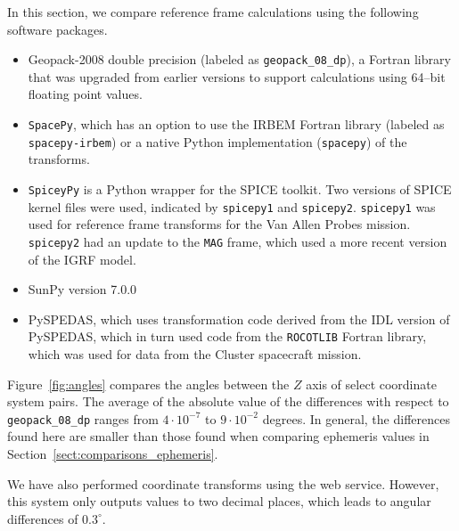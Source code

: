 \documentclass[draft]{agujournal2019}
\begin{document}
In this section, we compare reference frame calculations using the following software packages. 

\begin{itemize}
    \item Geopack-2008 double precision (labeled as \texttt{geopack\_08\_dp}), a Fortran library that was upgraded from earlier versions to support calculations using 64--bit floating point values. 
    \item \texttt{SpacePy}, which has an option to use the IRBEM Fortran library (labeled as \texttt{spacepy-irbem}) or a native Python implementation (\texttt{spacepy}) of the transforms.
    \item \texttt{SpiceyPy} is a Python wrapper for the SPICE toolkit. Two versions of SPICE kernel files were used, indicated by \texttt{spicepy1} and \texttt{spicepy2}. \texttt{spicepy1} was used for reference frame transforms for the Van Allen Probes mission. \texttt{spicepy2} had an update to the \texttt{MAG} frame, which used a more recent version of the IGRF model.
    \item SunPy version 7.0.0
    \item PySPEDAS, which uses transformation code derived from the IDL version of PySPEDAS, which in turn used code from the \texttt{ROCOTLIB} Fortran \cite{ROCOTLIB} library, which was used for data from the Cluster spacecraft mission.
\end{itemize}

Figure~\ref{fig:angles} compares the angles between the $Z$ axis of select coordinate system pairs. The average of the absolute value of the differences with respect to \texttt{geopack\_08\_dp} ranges from $4\cdot 10^{-7}$ to $9\cdot 10^{-2}$ degrees. In general, the differences found here are smaller than those found when comparing ephemeris values in Section~\ref{sect:comparisons_ephemeris}.

We have also performed coordinate transforms using the \cite{SSCWebCoordinateCalculator} web service. However, this system only outputs values to two decimal places, which leads to angular differences of $0.3^\circ$.
\end{document}
